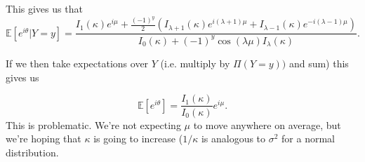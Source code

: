 \documentclass[]{report}
\begin{document}
This gives us that
\[
\mathbb{E}[e^{i \theta} | Y = y] = \frac{ I_1(\kappa) e^{i \mu} + \frac{(-1)^y}{2} \left(I_{\lambda + 1}(\kappa)e^{i(\lambda + 1) \mu}  + I_{\lambda - 1}(\kappa) e^{-i(\lambda - 1)\mu}\right)}{I_0(\kappa) + (-1)^y \cos(\lambda \mu) I_\lambda(\kappa)}.
\]

If we then take expectations over $Y$ (i.e. multiply by $\Pi(Y = y))$ and sum) this gives us

\[
\mathbb{E}[e^{i \theta}] = \frac{I_{1}(\kappa)}{I_0(\kappa)}e^{i \mu}.
\]
This is problematic. We're not expecting $ \mu$ to move anywhere on average, but we're hoping that $\kappa$ is going to increase ($1/ \kappa$ is analogous to $\sigma^2$ for a normal distribution.
\end{document}
